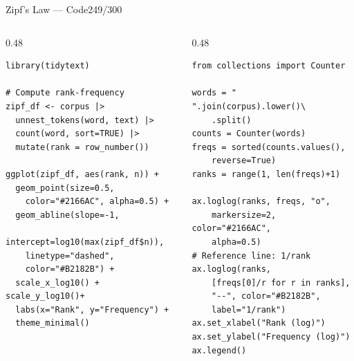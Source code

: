 \documentclass[10pt]{beamer}
\newcommand{\smark}[1]{\hfill{\scriptsize\color{codegray}#1}}
\begin{document}
\begin{frame}[fragile]{Zipf's Law --- Code}\smark{249/300}
\begin{columns}[T]
\begin{column}{0.48\textwidth}
\begin{lstlisting}[style=Rstyle]
library(tidytext)

# Compute rank-frequency
zipf_df <- corpus |>
  unnest_tokens(word, text) |>
  count(word, sort=TRUE) |>
  mutate(rank = row_number())

ggplot(zipf_df, aes(rank, n)) +
  geom_point(size=0.5,
    color="#2166AC", alpha=0.5) +
  geom_abline(slope=-1,
    intercept=log10(max(zipf_df$n)),
    linetype="dashed",
    color="#B2182B") +
  scale_x_log10() + scale_y_log10()+
  labs(x="Rank", y="Frequency") +
  theme_minimal()
\end{lstlisting}
\end{column}
\begin{column}{0.48\textwidth}
\begin{lstlisting}[style=Pystyle]
from collections import Counter

words = " ".join(corpus).lower()\
    .split()
counts = Counter(words)
freqs = sorted(counts.values(),
    reverse=True)
ranks = range(1, len(freqs)+1)

ax.loglog(ranks, freqs, "o",
    markersize=2, color="#2166AC",
    alpha=0.5)
# Reference line: 1/rank
ax.loglog(ranks,
    [freqs[0]/r for r in ranks],
    "--", color="#B2182B",
    label="1/rank")
ax.set_xlabel("Rank (log)")
ax.set_ylabel("Frequency (log)")
ax.legend()
\end{lstlisting}
\end{column}
\end{columns}
\end{frame}
\end{document}
